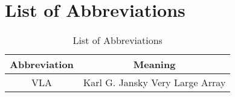
\chapter{List of Abbreviations}
\label{app:1}

\begin{table}[!hbt]
\begin{center}
\caption[List of Abbreviations]
{List of Abbreviations}
\begin{tabular}{cc}
\hline
\hline
\rule{0pt}{2.5ex}Abbreviation & Meaning\\
\hline
\rule{0pt}{2.5ex}VLA & Karl G. Jansky Very Large Array \\
\hline
\end{tabular}
\label{tab:6.4.1}
\end{center}
\end{table}


